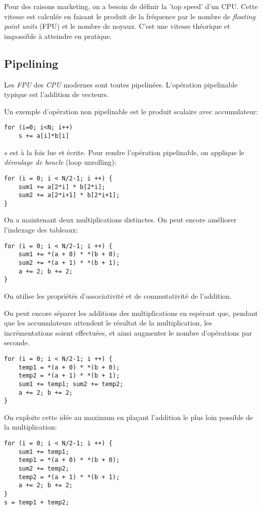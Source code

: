Pour des raisons marketing, on a besoin de définir la 'top speed' d'un CPU. Cette vitesse est calculée en faisant le produit de la fréquence par le nombre de \textit{floating point units} (FPU) et le nombre de noyaux. C'est une vitesse théorique et impossible à atteindre en pratique.

	\subsection{Pipelining}

Les \textit{FPU} des \textit{CPU} modernes sont toutes pipelinées. L'opération pipelinable typique est l'addition de vecteurs.

Un exemple d'opération non pipelinable est le produit scalaire avec accumulateur:
\begin{verbatim}
for (i=0; i<N; i++)
    s += a[i]*b[i]
\end{verbatim}

$s$ est à la fois lue et écrite. Pour rendre l'opération pipelinable, on applique le \textit{déroulage de boucle} (loop unrolling):
\begin{verbatim}
for (i = 0; i < N/2-1; i ++) {
    sum1 += a[2*i] * b[2*i];
    sum2 += a[2*i+1] * b[2*i+1];
}
\end{verbatim}
On a maintenant deux multiplications distinctes.
On peut encore améliorer l'indexage des tableaux:
\begin{verbatim}
for (i = 0; i < N/2-1; i ++) {
    sum1 += *(a + 0) * *(b + 0);
    sum2 += *(a + 1) * *(b + 1);
    a += 2; b += 2;
}
\end{verbatim}
On utilise les propriétés d'associativité et de commutativité de l'addition.

On peut encore séparer les additions des multiplications en espérant que, pendant que les accumulateurs attendent le résultat de la multiplication, les incrémentations soient effectuées, et ainsi augmenter le nombre d'opérations par seconde.
\begin{verbatim}
for (i = 0; i < N/2-1; i ++) {
    temp1 = *(a + 0) * *(b + 0);
    temp2 = *(a + 1) * *(b + 1);
    sum1 += temp1; sum2 += temp2;
    a += 2; b += 2;
}
\end{verbatim}

On exploite cette idée au maximum en plaçant l'addition le plus loin possible de la multiplication:

\begin{verbatim}
for (i = 0; i < N/2-1; i ++) {
    sum1 += temp1;
    temp1 = *(a + 0) * *(b + 0);
    sum2 += temp2;
    temp2 = *(a + 1) * *(b + 1);
    a += 2; b += 2;
}
s = temp1 + temp2;
\end{verbatim}

